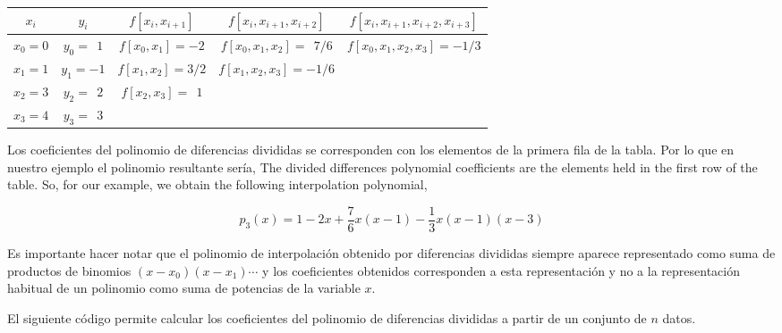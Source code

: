 \begin{table}[h]
\centering
{}
\begin{tabular}{ccccc}
$x_i$&$y_i$&$f\left[x_i,x_{i+1}\right]$&$f\left[x_i,x_{i+1},x_{i+2}\right]$&$f\left[x_i,x_{i+1},x_{i+2},x_{i+3}\right]$\\
\hline
$x_0=0$&$y_0=\ \  1$&$f\left[x_0,x_1\right]=-2$&$f\left[x_0,x_1,x_2\right]=\ \ 7/6$&$f\left[x_0,x_1,x_2,x_3\right]=-1/3$\\
$x_1=1$&$y_1=-1$&$f\left[x_1,x_2\right]=3/2$&$f\left[x_1,x_2,x_3\right]=-1/6$\\
$x_2=3$&$y_2=\ \ 2$&$f\left[x_2,x_3\right]=\ \ 1$\\
$x_3=4$&$y_3=\ \ 3$\\

\end{tabular}
\label{tabdif}
\end{table}
\begin{paracol}{2}
Los coeficientes del polinomio de diferencias divididas se corresponden con los elementos de la primera fila de la tabla. Por lo que en nuestro ejemplo el polinomio resultante sería,
\switchcolumn
The divided differences polynomial coefficients are the elements held in the first row of the table. So, for our example, we obtain the following interpolation polynomial, 
\end{paracol}
\begin{equation*}
p_3(x)=1-2x+\frac{7}{6}x(x-1)-\frac{1}{3}x(x-1)(x-3)
\end{equation*}
\begin{paracol}{2}
Es importante hacer notar que el polinomio de interpolación obtenido por diferencias divididas siempre aparece representado como suma de productos de binomios $(x-x_0)(x-x_1)\cdots$ y los coeficientes obtenidos corresponden a esta representación y no a la representación habitual de un polinomio como suma de potencias de la variable $x$. 

El siguiente código permite calcular los coeficientes del polinomio de diferencias divididas a partir de un conjunto de $n$ datos.
\end{paracol}

